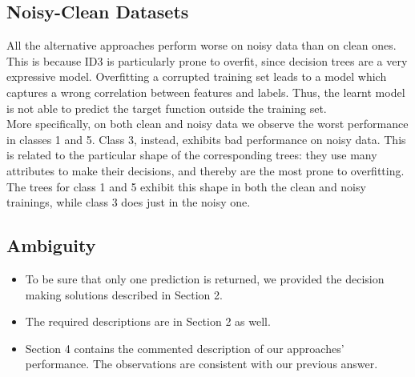 \documentclass{article}
\begin{document}
\subsection{Noisy-Clean Datasets}
\label{sec:datasetsQuestion}
All the alternative approaches perform worse on noisy data than on clean ones. This is because ID3 is particularly prone to overfit, since decision trees are a very expressive model. Overfitting a corrupted training set leads to a model which captures a wrong correlation between features and labels. Thus, the learnt model is not able to predict the target function outside the training set.\\
More specifically, on both clean and noisy data we observe the worst performance in classes 1 and 5. Class 3, instead, exhibits bad performance on noisy data. This is related to the particular shape of the corresponding trees: they use many attributes to make their decisions, and thereby are the most prone to overfitting. The trees for class 1 and 5 exhibit this shape in both the clean and noisy trainings, while class 3 does just in the noisy one.

\subsection{Ambiguity}
\begin{itemize}
	\item To be sure that only one prediction is returned, we provided the decision making solutions described in Section 2.
	\item The required descriptions are in Section 2 as well.
	\item Section 4 contains the commented description of our approaches' performance. The observations are consistent with our previous answer.
\end{itemize}
\end{document}
